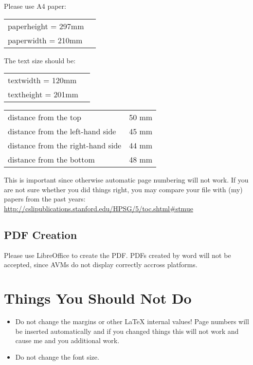 \documentclass[11pt,a4paper,fleqn]{article}
\begin{document}
Please use A4 paper:
\begin{table}[H]
\begin{tabular}{@{}ll}
paperheight  = 297mm\\
paperwidth   = 210mm
\end{tabular}
\end{table}
%
The text size should be:
\begin{table}[H]
\begin{tabular}{@{}ll}
textwidth  = 120mm\\
textheight = 201mm
\end{tabular}
\end{table}

\begin{table}[H]
\begin{tabular}{@{}l@{ = }l}
distance from the top & 50 mm\\
distance from the left-hand side & 45 mm\\
distance from the right-hand side & 44 mm\\
distance from the bottom & 48 mm\\
\end{tabular}
\end{table}

This is important since otherwise automatic page numbering will not work.
If you are not sure whether you did things right, you may compare your file
with (my) papers from the past years:\newline 
\url{http://cslipublications.stanford.edu/HPSG/5/toc.shtml#stmue}

\subsection{PDF Creation}
\label{sec-pdf-creation-word}

Please use LibreOffice to create the PDF. PDFs created by word will not be accepted, since AVMs do
not display correctly accross platforms.

\section{Things You Should Not Do}

\begin{itemize}
\item Do not change the margins or other \LaTeX{} internal values! Page numbers will be inserted automatically and
      if you changed things this will not work and cause me and you additional work.
\item Do not change the font size.
\end{itemize}
\end{document}

